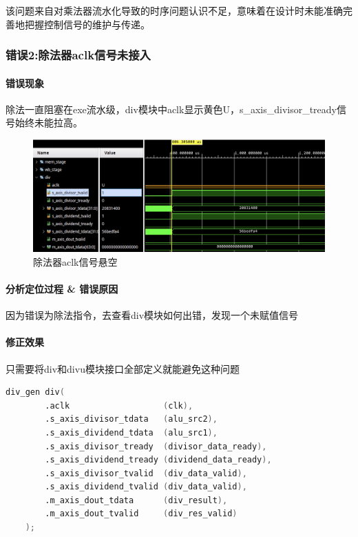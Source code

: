 \documentclass[UTF-8,twoside,c5size]{ctexart}
\begin{document}
	该问题来自对乘法器流水化导致的时序问题认识不足，意味着在设计时未能准确完善地把握控制信号的维护与传递。
	
	\subsubsection{错误2:除法器aclk信号未接入}
	
	\paragraph{错误现象}\hfill
	
	除法一直阻塞在exe流水级，div模块中aclk显示黄色U，s\_axis\_divisor\_tready信号始终未能拉高。
	
	\begin{figure}[h]
		\centering
		\includegraphics[width=0.7\linewidth]{pictures/no_aclk.png}
		\caption[no\_aclk]{除法器aclk信号悬空}
		\label{fig:noaclk}
	\end{figure}
	
	\paragraph{分析定位过程 \& 错误原因}\hfill
	
	因为错误为除法指令，去查看div模块如何出错，发现一个未赋值信号
	
	\paragraph{修正效果}\hfill
	
	只需要将div和divu模块接口全部定义就能避免这种问题
	
	\begin{lstlisting}[language=verilog]
	div_gen div(
		.aclk                   (clk),
		.s_axis_divisor_tdata   (alu_src2),
		.s_axis_dividend_tdata  (alu_src1),
		.s_axis_divisor_tready  (divisor_data_ready),
		.s_axis_dividend_tready (dividend_data_ready),
		.s_axis_divisor_tvalid  (div_data_valid),
		.s_axis_dividend_tvalid (div_data_valid),
		.m_axis_dout_tdata      (div_result),
		.m_axis_dout_tvalid     (div_res_valid)
	);
	\end{lstlisting}
\end{document}
